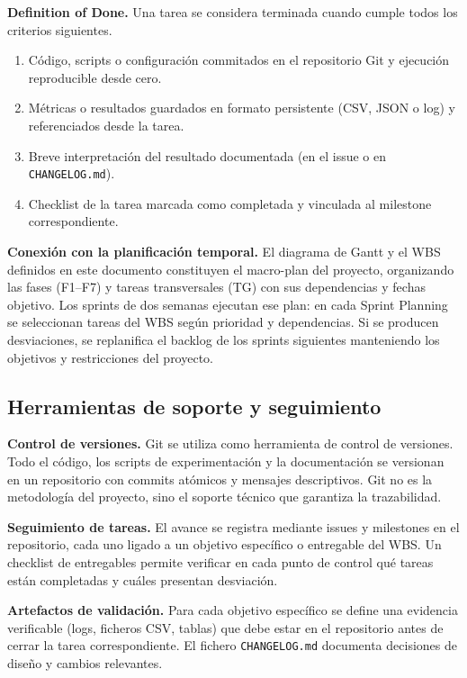 \documentclass[11pt,a4paper]{article}
\begin{document}
\textbf{Definition of Done.} Una tarea se considera terminada cuando cumple todos los criterios siguientes.
\begin{enumerate}[nosep,leftmargin=*]
\item Código, scripts o configuración commitados en el repositorio Git y ejecución reproducible desde cero.
\item Métricas o resultados guardados en formato persistente (CSV, JSON o log) y referenciados desde la tarea.
\item Breve interpretación del resultado documentada (en el issue o en \texttt{CHANGELOG.md}).
\item Checklist de la tarea marcada como completada y vinculada al milestone correspondiente.
\end{enumerate}

\textbf{Conexión con la planificación temporal.} El diagrama de Gantt y el WBS definidos en este documento constituyen el macro-plan del proyecto, organizando las fases (F1--F7) y tareas transversales (TG) con sus dependencias y fechas objetivo. Los sprints de dos semanas ejecutan ese plan: en cada Sprint Planning se seleccionan tareas del WBS según prioridad y dependencias. Si se producen desviaciones, se replanifica el backlog de los sprints siguientes manteniendo los objetivos y restricciones del proyecto.

\subsection{Herramientas de soporte y seguimiento}

\textbf{Control de versiones.} Git se utiliza como herramienta de control de versiones. Todo el código, los scripts de experimentación y la documentación se versionan en un repositorio con commits atómicos y mensajes descriptivos. Git no es la metodología del proyecto, sino el soporte técnico que garantiza la trazabilidad.

\textbf{Seguimiento de tareas.} El avance se registra mediante issues y milestones en el repositorio, cada uno ligado a un objetivo específico o entregable del WBS. Un checklist de entregables permite verificar en cada punto de control qué tareas están completadas y cuáles presentan desviación.

\textbf{Artefactos de validación.} Para cada objetivo específico se define una evidencia verificable (logs, ficheros CSV, tablas) que debe estar en el repositorio antes de cerrar la tarea correspondiente. El fichero \texttt{CHANGELOG.md} documenta decisiones de diseño y cambios relevantes.
\end{document}
